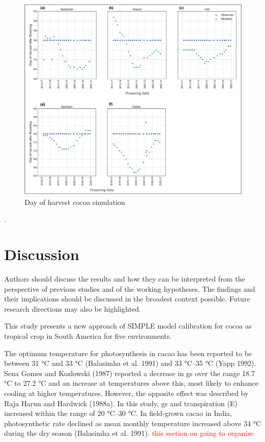 \documentclass[gene,journal,article,submit,moreauthors,pdftex]{Definitions/mdpi}
\begin{document}
\begin{figure}[h!]
	\centering
	\includegraphics[scale=0.4]{images/RegionHarvest2.png}
	\caption{\footnotesize {Day of harvest cocoa simulation\\ }} 
	\label{fig:dayH}
\end{figure}.
\newpage



\section{Discussion}
Authors should discuss the results and how they can be interpreted from the perspective of previous studies and of the working hypotheses. The findings and their implications should be discussed in the broadest context possible. Future research directions may also be highlighted.

This study presents a new approach of SIMPLE model calibration for cocoa as tropical crop in South America for five environments.

The optimum temperature for photosynthesis in cacao has
been reported to be between 31 °C and 33 °C (Balasimha et al.
1991) and 33 °C–35 °C (Yapp 1992). Sena Gomes and
Kozlowski (1987) reported a decrease in gs over the range
18.7 °C to 27.2 °C and an increase at temperatures above this,
most likely to enhance cooling at higher temperatures.
However, the opposite effect was described by Raja Harun
and Hardwick (1988a). In this study, gs and transpiration (E)
increased within the range of 20 °C–30 °C. In field-grown
cacao in India, photosynthetic rate declined as mean monthly
temperature increased above 34 °C during the dry season
(Balasimha et al. 1991). \cite{lahive2019}
\textcolor{red}{this section on going to organize}
\end{document}
